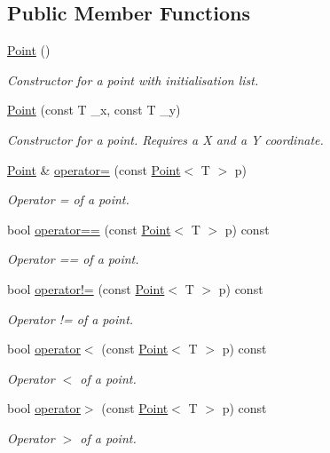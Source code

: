 \subsection*{Public Member Functions}
\begin{DoxyCompactItemize}
\item 
\mbox{\label{classPoint_aea76b1130f1a203722d8f2254ced8e66}} 
\hyperlink{classPoint_aea76b1130f1a203722d8f2254ced8e66}{Point} ()
\begin{DoxyCompactList}\small\item\em Constructor for a point with initialisation list. \end{DoxyCompactList}\item 
\hyperlink{classPoint_a8837d10c14dc15b72e6c0e15159e0e8c}{Point} (const T \+\_\+x, const T \+\_\+y)
\begin{DoxyCompactList}\small\item\em Constructor for a point. Requires a X and a Y coordinate. \end{DoxyCompactList}\item 
\hyperlink{classPoint}{Point} \& \hyperlink{classPoint_a42cf65d5594e882fc05a25fb344618fb}{operator=} (const \hyperlink{classPoint}{Point}$<$ T $>$ p)
\begin{DoxyCompactList}\small\item\em Operator = of a point. \end{DoxyCompactList}\item 
bool \hyperlink{classPoint_a63bcffe1a385653e0dd7d3a39c06a631}{operator==} (const \hyperlink{classPoint}{Point}$<$ T $>$ p) const
\begin{DoxyCompactList}\small\item\em Operator == of a point. \end{DoxyCompactList}\item 
bool \hyperlink{classPoint_accaa0100c0c631ad03280446a0b05339}{operator!=} (const \hyperlink{classPoint}{Point}$<$ T $>$ p) const
\begin{DoxyCompactList}\small\item\em Operator != of a point. \end{DoxyCompactList}\item 
bool \hyperlink{classPoint_ac6b57554a6941b07668b52c66fe20fae}{operator$<$} (const \hyperlink{classPoint}{Point}$<$ T $>$ p) const
\begin{DoxyCompactList}\small\item\em Operator $<$ of a point. \end{DoxyCompactList}\item 
bool \hyperlink{classPoint_ade386be90f64de342ada7165415daf07}{operator$>$} (const \hyperlink{classPoint}{Point}$<$ T $>$ p) const
\begin{DoxyCompactList}\small\item\em Operator $>$ of a point. \end{DoxyCompactList}\end{DoxyCompactItemize}
